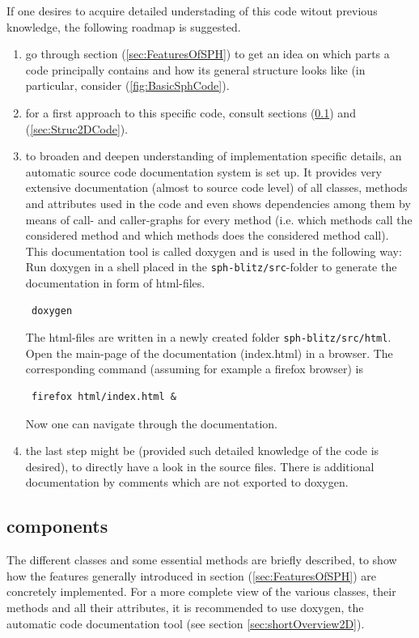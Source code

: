 \documentclass{report}
\begin{document}
If one desires to acquire detailed understading of this code witout previous knowledge, the following roadmap is suggested.
\begin{enumerate}
 \item go through section (\ref{sec:FeaturesOfSPH}) to get an idea on which parts a code principally contains and how its general structure looks like (in particular, consider (\ref{fig:BasicSphCode}).
\item for a first approach to this specific code, consult sections (\ref{sec:Comp2DCode}) and (\ref{sec:Struc2DCode}).
\item to broaden and deepen understanding of implementation specific details,
an automatic source code documentation system is set up. It provides very extensive documentation (almost to source code level) of all classes, methods and attributes used in the code and even shows dependencies among them by means of call- and caller-graphs for every method (i.e. which methods call the considered method and which methods does the considered method call).
This documentation tool is called doxygen and is used in the following way:
Run doxygen in a shell placed in the {\tt sph-blitz/src}-folder to generate the documentation in form of html-files.
\begin{verbatim} doxygen
\end{verbatim}
The html-files are written in a newly created folder {\tt sph-blitz/src/html}. Open the main-page of the documentation (index.html) in a browser. The corresponding command (assuming for example a firefox browser) is
\begin{verbatim} firefox html/index.html &
\end{verbatim}
Now one can navigate through the documentation.
\item the last step might be (provided such detailed knowledge of the code is desired), to directly have a look in the source files. There is additional documentation by comments which are not exported to doxygen.
\end{enumerate}










\subsection{components}
\label{sec:Comp2DCode}
The different classes and some essential methods are briefly described, to show how the  features generally introduced in section (\ref{sec:FeaturesOfSPH}) are concretely implemented. For a more complete view of the various classes, their methods and all their attributes, it is recommended to use doxygen, the automatic code documentation tool (see section \ref{sec:shortOverview2D}).
\end{document}
